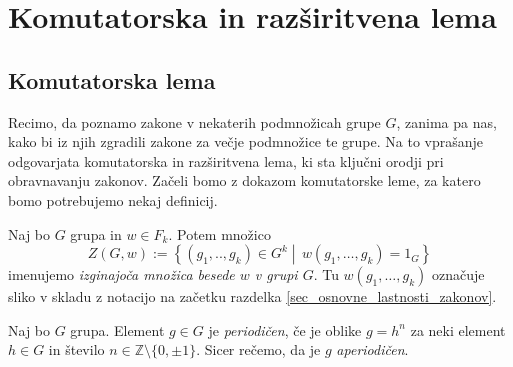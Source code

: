 

\section{Komutatorska in razširitvena lema}

\subsection{Komutatorska lema}



Recimo, da poznamo zakone v nekaterih podmnožicah grupe $G$, zanima pa nas, kako bi iz njih zgradili zakone za večje podmnožice te grupe. Na to vprašanje odgovarjata komutatorska in razširitvena lema,
ki sta ključni orodji pri obravnavanju zakonov. Začeli bomo z dokazom komutatorske leme, za katero bomo potrebujemo nekaj definicij.

\begin{definicija}
    \label{def_izginjajoca_mnozica}
    Naj bo $G$ grupa in $w \in  F_k$. Potem množico \begin{equation*}
    Z(G, w) := \left\{ (g_1, .., g_{k}) \in  G^{k}  \middle|\, w(g_1, \ldots, g_{k}) = 1_G \right\} 
    \end{equation*}  
    imenujemo \emph{izginajoča množica besede $w$ v grupi $G$}. Tu $w(g_1, \ldots, g_{k})$ označuje sliko v skladu z notacijo na začetku razdelka \ref{sec_osnovne_lastnosti_zakonov}.  
    \end{definicija}

\begin{definicija}\label{def_aperiodicna_beseda}
Naj bo $G$ grupa. Element $g \in  G$ je \emph{periodičen}, če je oblike $g = h^{n}$ za neki element $h \in G$ in število $n \in \mathbb{Z} \setminus \{ 0, \pm 1 \}$. Sicer rečemo, da je $g$ \emph{aperiodičen}.
\end{definicija}



